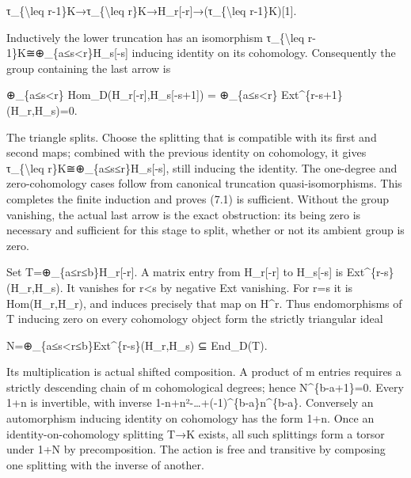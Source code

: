 \documentclass[11pt]{article}
\begin{document}
τ\_\allowbreak{}\{\textbackslash{}leq r-1\}K\allowbreak{}→τ\_\allowbreak{}\{\textbackslash{}leq r\}K\allowbreak{}→H\_\allowbreak{}r[-r]\allowbreak{}\allowbreak{}→(τ\_\allowbreak{}\{\textbackslash{}leq r-1\}K)\allowbreak{}[1]\allowbreak{}.

Inductively the lower truncation has an isomorphism τ\_\allowbreak{}\{\textbackslash{}leq r-1\}K≅\allowbreak{}⊕\_\allowbreak{}\{a≤s<r\}H\_\allowbreak{}s[-s]\allowbreak{} inducing identity on its cohomology. Consequently the group containing the last arrow is

\allowbreak{}⊕\_\allowbreak{}\{a≤s<r\} Hom\_\allowbreak{}D(H\_\allowbreak{}r[-r]\allowbreak{},\allowbreak{}H\_\allowbreak{}s[-s\allowbreak{}+1]\allowbreak{})\allowbreak{} \allowbreak{}= \allowbreak{}⊕\_\allowbreak{}\{a≤s<r\} Ext\textasciicircum{}\{r-s\allowbreak{}+1\}(H\_\allowbreak{}r,\allowbreak{}H\_\allowbreak{}s)\allowbreak{}\allowbreak{}=0.

The triangle splits. Choose the splitting that is compatible with its first and second maps; combined with the previous identity on cohomology,\allowbreak{} it gives τ\_\allowbreak{}\{\textbackslash{}leq r\}K≅\allowbreak{}⊕\_\allowbreak{}\{a≤s≤r\}H\_\allowbreak{}s[-s]\allowbreak{},\allowbreak{} still inducing the identity. The one-degree and zero-cohomology cases follow from canonical truncation quasi-isomorphisms. This completes the finite induction and proves (7.1)\allowbreak{} is sufficient. Without the group vanishing,\allowbreak{} the actual last arrow is the exact obstruction:\allowbreak{} its being zero is necessary and sufficient for this stage to split,\allowbreak{} whether or not its ambient group is zero.

Set T\allowbreak{}=\allowbreak{}⊕\_\allowbreak{}\{a≤r≤b\}H\_\allowbreak{}r[-r]\allowbreak{}. A matrix entry from H\_\allowbreak{}r[-r]\allowbreak{} to H\_\allowbreak{}s[-s]\allowbreak{} is Ext\textasciicircum{}\{r-s\}(H\_\allowbreak{}r,\allowbreak{}H\_\allowbreak{}s)\allowbreak{}. It vanishes for r\textless s by negative Ext vanishing. For r\allowbreak{}=s it is Hom(H\_\allowbreak{}r,\allowbreak{}H\_\allowbreak{}r)\allowbreak{},\allowbreak{} and induces precisely that map on H\^{}r. Thus endomorphisms of T inducing zero on every cohomology object form the strictly triangular ideal

N\allowbreak{}=\allowbreak{}⊕\_\allowbreak{}\{a≤s<r≤b\}Ext\textasciicircum{}\{r-s\}(H\_\allowbreak{}r,\allowbreak{}H\_\allowbreak{}s)\allowbreak{} ⊆ End\_\allowbreak{}D(T)\allowbreak{}.

Its multiplication is actual shifted composition. A product of m entries requires a strictly descending chain of m cohomological degrees; hence N\textasciicircum{}\{b-a\allowbreak{}+1\}\allowbreak{}=0. Every 1\allowbreak{}+n is invertible,\allowbreak{} with inverse 1-n\allowbreak{}+n²-…\allowbreak{}+(-1)\allowbreak{}\textasciicircum{}\{b-a\}n\textasciicircum{}\{b-a\}. Conversely an automorphism inducing identity on cohomology has the form 1\allowbreak{}+n. Once an identity-on-cohomology splitting T\allowbreak{}→K exists,\allowbreak{} all such splittings form a torsor under 1\allowbreak{}+N by precomposition. The action is free and transitive by composing one splitting with the inverse of another.
\end{document}
